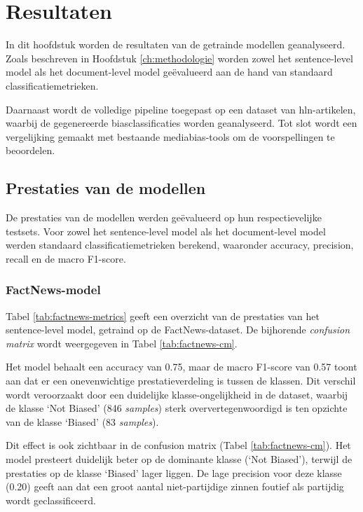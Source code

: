 \chapter{Resultaten}
\label{ch:resultaten}

In dit hoofdstuk worden de resultaten van de getrainde modellen geanalyseerd. Zoals beschreven in Hoofdstuk \ref{ch:methodologie} worden zowel het sentence-level model als het document-level model geëvalueerd aan de hand van standaard classificatiemetrieken.

Daarnaast wordt de volledige pipeline toegepast op een dataset van \gls{hln}-artikelen, waarbij de gegenereerde biasclassificaties worden geanalyseerd. Tot slot wordt een vergelijking gemaakt met bestaande mediabias-tools om de voorspellingen te beoordelen.

\section{Prestaties van de modellen}
\label{sec:prestaties-van-modellen}

De prestaties van de modellen werden geëvalueerd op hun respectievelijke testsets. Voor zowel het sentence-level model als het document-level model werden standaard classificatiemetrieken berekend, waaronder accuracy, precision, recall en de macro F1-score.

\subsection{FactNews-model}

Tabel \ref{tab:factnews-metrics} geeft een overzicht van de prestaties van het sentence-level model, getraind op de FactNews-dataset. De bijhorende \textit{confusion matrix} wordt weergegeven in Tabel \ref{tab:factnews-cm}.

Het model behaalt een accuracy van 0.75, maar de macro F1-score van 0.57 toont aan dat er een onevenwichtige prestatieverdeling is tussen de klassen. Dit verschil wordt veroorzaakt door een duidelijke klasse-ongelijkheid in de dataset, waarbij de klasse `Not Biased' (846 \textit{samples}) sterk oververtegenwoordigd is ten opzichte van de klasse `Biased' (83 \textit{samples}).

Dit effect is ook zichtbaar in de confusion matrix (Tabel \ref{tab:factnews-cm}). Het model presteert duidelijk beter op de dominante klasse (`Not Biased'), terwijl de prestaties op de klasse `Biased' lager liggen. De lage precision voor deze klasse (0.20) geeft aan dat een groot aantal niet-partijdige zinnen foutief als partijdig wordt geclassificeerd.

